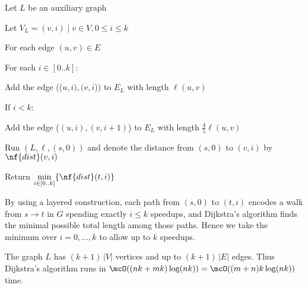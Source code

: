 \documentclass{article}
\begin{document}
\begin{solution}
\begin{steps}
  \item Let $ L $ be an auxiliary graph
  \item Let $V_L = { (v, i) \mid v \in V, 0 \leq i \leq k }$ \begin{steps}
    \item For each edge $(u,v)\in E$ \begin{steps}
      \item For each $ i\in[0..k] $: \begin{steps}
        \item Add the edge (($ u,i ),( v,i $)) to $ E_L $ with length $ \ell(u,v) $
        \item If $ i<k $: \begin{steps}
          \item Add the edge ($(u, i), (v, i+1)$) to $ E_L $ with length $\frac{4}{5}\ell(u,v)$
        \end{steps}
      \end{steps}
    \end{steps}
  \end{steps}
  \item Run $(L,\ell,(s,0))$ and denote the distance from $ (s,0) $ to $ (v,i) $ by $ \nf{dist}(v,i) $
  \item Return $ \min\limits_{i\in[0..k]}\{\nf{dist}(t,i)\} $
\end{steps}
By using a layered construction, each path from $(s,0)$ to $(t,i)$ encodes a walk from $s\to t$ in $G$ spending exactly $i \leq k$ speedups, and Dijkstra's algorithm finds the minimal possible total length among those paths.
Hence we take the minimum over $i=0,\dots,k$ to allow up to $k$ speedups.

The graph $L$ has $(k+1)\,|V|$ vertices and up to $(k+1)\,|E|$ edges.
Thus Dijkstra's algorithm runs in $\mcO((nk + mk)\log(nk))=\mcO((m+n)k\log(nk))$ time.


\end{solution}
\pagebreak
\end{document}
